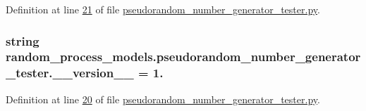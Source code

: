 Definition at line \hyperlink{pseudorandom__number__generator__tester_8py_source_l00021}{21} of file \hyperlink{pseudorandom__number__generator__tester_8py_source}{pseudorandom\+\_\+number\+\_\+generator\+\_\+tester.\+py}.

\hypertarget{namespacerandom__process__models_1_1pseudorandom__number__generator__tester_abdadf15e475ca77a4ef2bebd886b8dcc}{}
\subsubsection[{\+\_\+\+\_\+version\+\_\+\+\_\+}]{\setlength{\rightskip}{0pt plus 5cm}string random\+\_\+process\+\_\+models.\+pseudorandom\+\_\+number\+\_\+generator\+\_\+tester.\+\_\+\+\_\+version\+\_\+\+\_\+ = \textquotesingle{}1.\textquotesingle{}}\label{namespacerandom__process__models_1_1pseudorandom__number__generator__tester_abdadf15e475ca77a4ef2bebd886b8dcc}


Definition at line \hyperlink{pseudorandom__number__generator__tester_8py_source_l00020}{20} of file \hyperlink{pseudorandom__number__generator__tester_8py_source}{pseudorandom\+\_\+number\+\_\+generator\+\_\+tester.\+py}.

